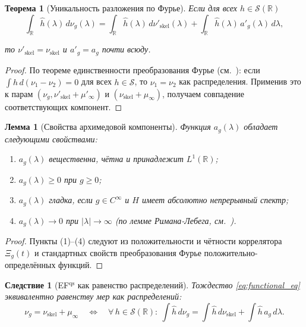 \documentclass{article}
\numberwithin{equation}{section}
\theoremstyle{plain}
\newtheorem{theorem}{Теорема}
\newtheorem{lemma}{Лемма}
\newtheorem{corollary}{Следствие}
\theoremstyle{definition}
\theoremstyle{remark}
\def\infty{∞}\def\partial{∂}\def\sum{Σ}\def\int{∫}%
\begin{document}
\begin{theorem}[Уникальность разложения по Фурье]
\label{thm:fourier-uniq}
Если для всех $h\in\mathcal S(\mathbb R)$
\begin{equation}
\int_{\mathbb R} \widehat h(\lambda)\,d\nu_g(\lambda)
= \int_{\mathbb R} \widehat h(\lambda)\,d\nu'_{\mathrm{skel}}(\lambda)
+ \int_{\mathbb R} \widehat h(\lambda)\,a'_g(\lambda)\,d\lambda,
\label{eq:QSSC0049}
\end{equation}

то $\nu'_{\mathrm{skel}}=\nu_{\mathrm{skel}}$ и $a'_g=a_g$ почти всюду.
\end{theorem}

\begin{proof}
По теореме единственности преобразования Фурье (см.~\cite{SteinWeiss1971}):
если $\int \widehat h\,d(\nu_1-\nu_2)=0$ для всех $h\in\mathcal S$, 
то $\nu_1=\nu_2$ как распределения.
Применив это к парам $(\nu_g,\nu'_{\mathrm{skel}}+\mu'_\infty)$
и $(\nu_{\mathrm{skel}}+\mu_\infty)$, получаем совпадение соответствующих компонент.
\end{proof}

\begin{lemma}[Свойства архимедовой компоненты]
\label{lemma:archimedian}
Функция $a_g(\lambda)$ обладает следующими свойствами:
\begin{enumerate}
\item $a_g(\lambda)$ вещественна, чётна и принадлежит $L^1(\mathbb R)$;
\item $a_g(\lambda)\ge 0$ при $g\ge 0$;
\item $a_g(\lambda)$ гладка, если $g\in C^\infty$ и $H$ имеет абсолютно непрерывный спектр;
\item $a_g(\lambda)\to 0$ при $|\lambda|\to\infty$ (по лемме Римана-Лебега, см.~\cite{Katznelson2004}).
\end{enumerate}
\end{lemma}

\begin{proof}
Пункты (1)–(4) следуют из положительности и чётности коррелятора $\Xi_g(t)$
и стандартных свойств преобразования Фурье положительно-определённых функций.
\end{proof}

\begin{corollary}[EF$^{\mathrm{qs}}$ как равенство распределений]
\label{cor:ef_distribution}
Тождество \eqref{eq:functional_eq} эквивалентно равенству мер как распределений:
\begin{equation}
\label{eq:ef_distribution}
\nu_g = \nu_{\mathrm{skel}} + \mu_\infty
\quad\Longleftrightarrow\quad
\forall\,h\in\mathcal S(\mathbb R):\ 
\int \widehat h\,d\nu_g = \int \widehat h\,d\nu_{\mathrm{skel}}+\int \widehat h\,a_g\,d\lambda.
\end{equation}
\end{corollary}
\end{document}
